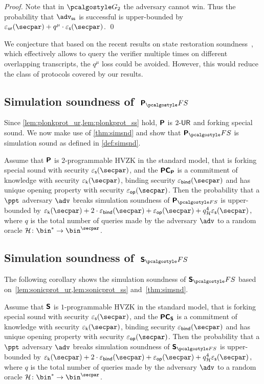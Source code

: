 \begin{proof}
	Note that in $\game{2}$ the adversary cannot win. Thus the probability
	that $\advss$ is successful is upper-bounded by
	$\epsur(\secpar) + q^{\mu} \cdot \epss(\secpar)$.  \qed
\end{proof}


We conjecture that based on the recent results on state restoration soundness~\cite{cryptoeprint:2020:1351}, which effectively allows to query the verifier multiple times on different overlapping transcripts, the $q^{\mu}$ loss could be avoided. However, this would reduce the class of protocols covered by our results. 


\subsection{Simulation soundness of~$\plonkprotfs$}
Since \cref{lem:plonkprot_ur,lem:plonkprot_ss} hold, $\bm{\mathsf{P}}$ is ${2\text{-}\mathsf{UR}}$
and forking special sound. We now make use of \cref{thm:simsnd} and show that
$\plonkprot_\fs$ is simulation sound as defined in
\cref{def:simsnd}.

 \begin{corollary}
   \label{cor:simsnd-P}
   Assume that $\bm{\mathsf{P}}$ is $2$-programmable HVZK in the standard model, that
   is forking special sound with security $\epss(\secpar)$, and the $\bm{\mathsf{PC}}_{\bm{\mathsf{P}}}$ is a commitment of knowledge with
   security $\epsk(\secpar)$, binding security $\epsbind(\secpar)$ and has unique
   opening property with security $\epsop(\secpar)$. Then the probability that a
   $\ppt$ adversary $\adv$ breaks simulation soundness of $\plonkprot_{\fs}$ is
   upper-bounded by
   \( \epsk(\secpar) + 2\cdot\epsbind(\secpar) + \epsop(\secpar) + q_\ro^4
   \epss(\secpar)\,, \) where $q$ is the total number of queries made by the
   adversary $\adv$ to a random oracle $\ro\colon \bin^{*} \to \bin^{\secpar}$.
 \end{corollary}

\subsection{Simulation soundness of~$\sonicprotfs$}
The following corollary shows the simulation soundness of $\sonicprotfs$ based on~\cref{lem:sonicprot_ur,lem:sonicprot_ss} and~\cref{thm:simsnd}.
\begin{corollary}
	\label{cor:simsnd-S}
	Assume that $\bm{\mathsf{S}}$ is $1$-programmable HVZK in the standard model, that
	is forking special sound with security $\epss(\secpar)$, and the $\bm{\mathsf{PC}}_{\bm{\mathsf{S}}}$ is a commitment of knowledge with
	security $\epsk(\secpar)$, binding security $\epsbind(\secpar)$ and has unique
	opening property with security $\epsop(\secpar)$. Then the probability that a
	$\ppt$ adversary $\adv$ breaks simulation soundness of $\sonicprot_{\fs}$ is
	upper-bounded by
	\( \epsk(\secpar) + 2\cdot\epsbind(\secpar) + \epsop(\secpar) + q_\ro^4
	\epss(\secpar)\,, \) where $q$ is the total number of queries made by the
	adversary $\adv$ to a random oracle $\ro\colon \bin^{*} \to \bin^{\secpar}$.
\end{corollary}

